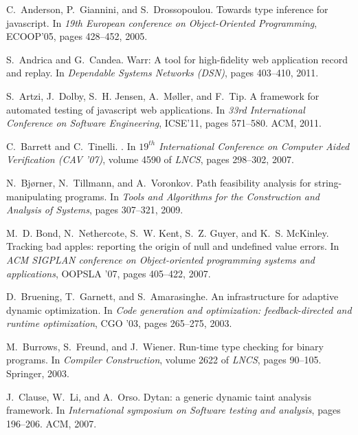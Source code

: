 \documentclass{sig-alternate}
\begin{document}
\newpage
{\small
\begin{thebibliography}{10}

C.~Anderson, P.~Giannini, and S.~Drossopoulou.
\newblock Towards type inference for javascript.
\newblock In {\em 19th European conference on Object-Oriented Programming},
  ECOOP'05, pages 428--452, 2005.

S.~Andrica and G.~Candea.
\newblock Warr: A tool for high-fidelity web application record and replay.
\newblock In {\em Dependable Systems Networks (DSN)}, pages 403--410, 2011.

S.~Artzi, J.~Dolby, S.~H. Jensen, A.~M{\o}ller, and F.~Tip.
\newblock A framework for automated testing of javascript web applications.
\newblock In {\em 33rd International Conference on Software Engineering},
  ICSE'11, pages 571--580. ACM, 2011.

C.~Barrett and C.~Tinelli.
.
\newblock In {\em $19^{th}$ International Conference on Computer Aided
  Verification (CAV '07)}, volume 4590 of {\em LNCS}, pages 298--302, 2007.

N.~Bj{\o}rner, N.~Tillmann, and A.~Voronkov.
\newblock Path feasibility analysis for string-manipulating programs.
\newblock In {\em Tools and Algorithms for the Construction and Analysis of
  Systems}, pages 307--321, 2009.

M.~D. Bond, N.~Nethercote, S.~W. Kent, S.~Z. Guyer, and K.~S. McKinley.
\newblock Tracking bad apples: reporting the origin of null and undefined value
  errors.
\newblock In {\em ACM SIGPLAN conference on Object-oriented programming systems
  and applications}, OOPSLA '07, pages 405--422, 2007.

D.~Bruening, T.~Garnett, and S.~Amarasinghe.
\newblock An infrastructure for adaptive dynamic optimization.
\newblock In {\em Code generation and optimization: feedback-directed and
  runtime optimization}, CGO '03, pages 265--275, 2003.

M.~Burrows, S.~Freund, and J.~Wiener.
\newblock Run-time type checking for binary programs.
\newblock In {\em Compiler Construction}, volume 2622 of {\em LNCS}, pages
  90--105. Springer, 2003.

J.~Clause, W.~Li, and A.~Orso.
\newblock Dytan: a generic dynamic taint analysis framework.
\newblock In {\em International symposium on Software testing and analysis},
  pages 196--206. ACM, 2007.


\end{thebibliography}}
\end{document}
